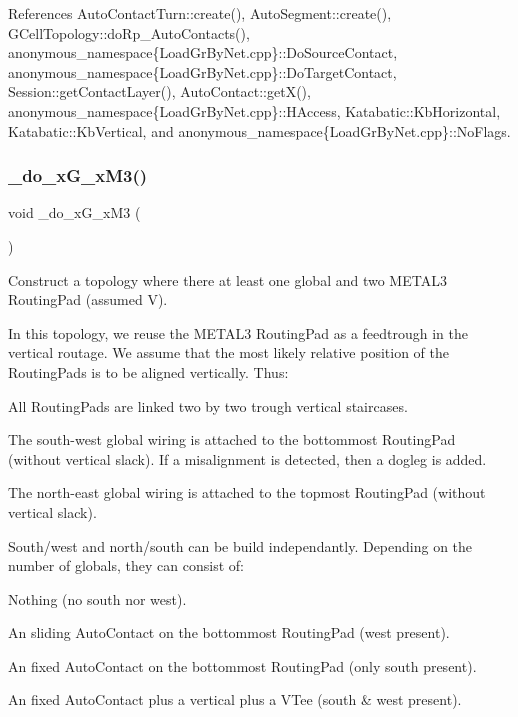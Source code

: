 References Auto\+Contact\+Turn\+::create(), Auto\+Segment\+::create(), G\+Cell\+Topology\+::do\+Rp\+\_\+\+Auto\+Contacts(), anonymous\+\_\+namespace\{\+Load\+Gr\+By\+Net.\+cpp\}\+::\+Do\+Source\+Contact, anonymous\+\_\+namespace\{\+Load\+Gr\+By\+Net.\+cpp\}\+::\+Do\+Target\+Contact, Session\+::get\+Contact\+Layer(), Auto\+Contact\+::get\+X(), anonymous\+\_\+namespace\{\+Load\+Gr\+By\+Net.\+cpp\}\+::\+H\+Access, Katabatic\+::\+Kb\+Horizontal, Katabatic\+::\+Kb\+Vertical, and anonymous\+\_\+namespace\{\+Load\+Gr\+By\+Net.\+cpp\}\+::\+No\+Flags.

\mbox{\label{group__LoadGlobalRouting_ga007efc725aae31782204a44949765cb4}} 
\subsubsection{\texorpdfstring{\+\_\+do\+\_\+x\+G\+\_\+x\+M3()}{\_do\_xG\_xM3()}}
{\footnotesize\ttfamily void \+\_\+do\+\_\+x\+G\+\_\+x\+M3 (\begin{DoxyParamCaption}{ }\end{DoxyParamCaption})\hspace{0.3cm}{\ttfamily [private]}}

Construct a topology where there at least one global and two {\ttfamily M\+E\+T\+A\+L3} Routing\+Pad (assumed V).

In this topology, we reuse the {\ttfamily M\+E\+T\+A\+L3} Routing\+Pad as a feedtrough in the vertical routage. We assume that the most likely relative position of the Routing\+Pads is to be aligned vertically. Thus\+:
\begin{DoxyItemize}
\item All Routing\+Pads are linked two by two trough vertical staircases.
\item The south-\/west global wiring is attached to the bottommost Routing\+Pad (without vertical slack). If a misalignment is detected, then a dogleg is added.
\item The north-\/east global wiring is attached to the topmost Routing\+Pad (without vertical slack).
\end{DoxyItemize}

South/west and north/south can be build independantly. Depending on the number of globals, they can consist of\+:
\begin{DoxyItemize}
\item Nothing (no south nor west).
\item An sliding Auto\+Contact on the bottommost Routing\+Pad (west present).
\item An fixed Auto\+Contact on the bottommost Routing\+Pad (only south present).
\item An fixed Auto\+Contact plus a vertical plus a V\+Tee (south \& west present).
\end{DoxyItemize}

